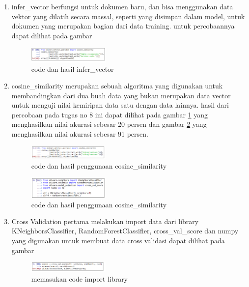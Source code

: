 \begin{enumerate}
\item infer\_vector
\subitem berfungsi untuk dokumen baru, dan bisa menggunakan data vektor yang dilatih secara massal, seperti yang disimpan dalam model, untuk dokumen yang merupakan bagian dari data training. untuk percobaannya dapat dilihat pada gambar
\begin{figure}[H]
\includegraphics[width=4cm]{figures/1174002/chapter5/29.png}
\centering
\caption{code dan hasil infer\_vector}
\end{figure}

\item cosine\_similarity
\subitem merupakan sebuah algoritma yang digunakan untuk membandingkan dari dua buah data yang bukan merupakan data vector untuk menguji nilai kemiripan data satu dengan data lainnya. hasil dari percobaan pada tugas no 8 ini dapat dilihat pada gambar \ref{l10} yang menghasilkan nilai akurasi sebesar 20 persen dan gambar \ref{l11} yang menghasilkan nilai akurasi sebesar 91 persen.
\begin{figure}[H]
\includegraphics[width=4cm]{figures/1174002/chapter5/30.png}
\centering
\caption{code dan hasil penggunaan cosine\_similarity}
\label{l10}
\end{figure}

\begin{figure}[H]
\includegraphics[width=4cm]{figures/1174002/chapter5/31.png}
\centering
\caption{code dan hasil penggunaan cosine\_similarity}
\label{l11}
\end{figure}

\item Cross Validation
\subitem pertama melakukan import data dari library KNeighborsClassifier, RandomForestClassifier, cross\_val\_score dan numpy yang digunakan untuk membuat data cross validasi dapat dilihat pada gambar
\begin{figure}[H]
\includegraphics[width=4cm]{figures/1174002/chapter5/32.png}
\centering
\caption{memasukan code import library}
\end{figure}


\end{enumerate}

